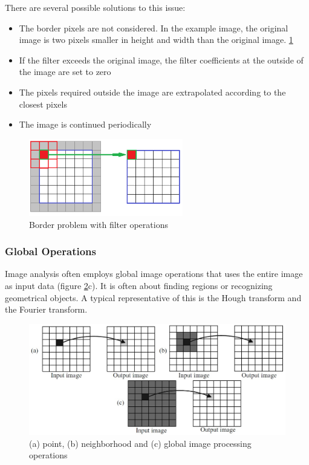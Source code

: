 There are several possible solutions to this issue:
\begin{itemize}
\item The border pixels are not considered. In the example image, the original image 
is two pixels smaller in height and width than the original image. \ref{fig:image_handling}
\item If the filter exceeds the original image, the filter coefficients
at the outside of the image are set to zero
\item The pixels required outside the image are extrapolated according to the closest pixels
\item The image is continued periodically
\end{itemize}
    
\begin{figure}[b!]
    \centering
    \includegraphics[width=0.6\textwidth]{images/theory/border_handling.png}
    \caption{Border problem with filter operations \cite{border_handling}}
    \label{fig:image_handling}
\end{figure}


\subsubsection*{Global Operations}
Image analysis often employs global image operations that uses the entire image as input data (figure \ref{fig:image_operation}c). It is often about finding regions or recognizing geometrical objects. A typical representative of this is the Hough transform and the Fourier transform.

\begin{figure}[tb!]
    \centering
    \includegraphics[width=\textwidth]{images/theory/image_operations.jpg}
    \caption{(a) point, (b) neighborhood and (c) global image processing
    operations \cite{image_operation}}
    \label{fig:image_operation}
\end{figure}

